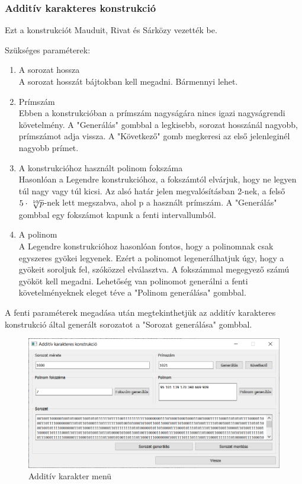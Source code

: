 \documentclass[12pt]{article}
\begin{document}
	\subsubsection{Additív karakteres konstrukció}
	Ezt a konstrukciót Mauduit, Rivat és Sárközy vezették be. \cite{additive} \par
	Szükséges paraméterek:
	\begin{enumerate}
		\bfseries \item A sorozat hossza \\
		\normalfont A sorozat hosszát bájtokban kell megadni. Bármennyi lehet. \\
		\bfseries \item Prímszám \\
		\normalfont Ebben a konstrukcióban a prímszám nagyságára nincs igazi nagyságrendi követelmény. A "Generálás" gombbal a legkisebb, sorozat hosszánál nagyobb, prímszámot adja vissza. A "Következő" gomb megkeresi az első jelenleginél nagyobb prímet.
		\bfseries \item A konstrukcióhoz használt polinom fokszáma \\
		\normalfont Hasonlóan a Legendre konstrukcióhoz, a fokszámtól elvárjuk, hogy ne legyen túl nagy vagy túl kicsi. Az alsó határ jelen megvalósításban 2-nek, a felső $5\cdot\sqrt[\leftroot{-2}\uproot{2}10]{p}$-nek lett megszabva, ahol p a használt prímszám. A "Generálás" gombbal egy fokszámot kapunk a fenti intervallumból.
		\bfseries \item A polinom \\
		\normalfont A Legendre konstrukcióhoz hasonlóan fontos, hogy a polinomnak csak egyszeres gyökei legyenek. Ezért a polinomot legenerálhatjuk úgy, hogy a gyökeit soroljuk fel, szóközzel elválasztva. A fokszámmal megegyező számú gyököt kell megadni. Lehetőség van polinomot generálni a fenti követelményeknek eleget téve a "Polinom generálása" gombbal.
	\end{enumerate}
	A fenti paraméterek megadása után megtekinthetjük az additív karakteres konstrukció által generált sorozatot a "Sorozat generálása" gombbal.
	\begin{figure}[h]
		\centering
		\begin{minipage}{\textwidth} %
			\includegraphics[width=\textwidth]{additivemenu.png}
		\end{minipage}
		\caption{Additív karakter menü}
	\end{figure}
\end{document}
